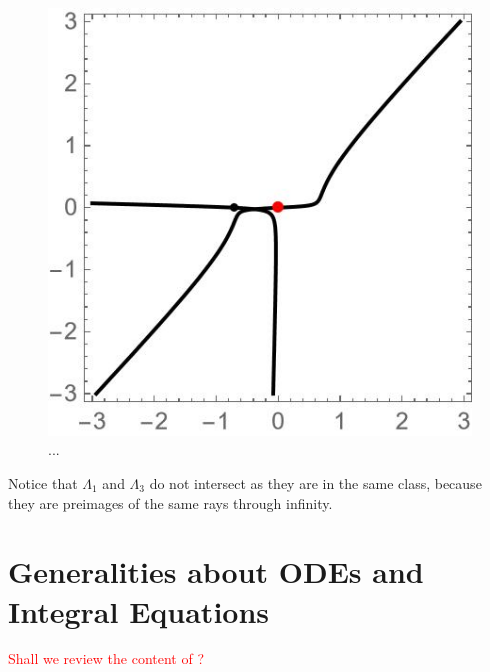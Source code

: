 \documentclass{article}
\theoremstyle{definition}
\begin{document}
\begin{figure}[ht]
     \includegraphics[scale=0.4]{figures/contour--AL4--12--inter.jpg}
    \caption{...}
    \label{fig:intersection_thimbles-AL4}
\end{figure}
Notice that $\Lambda_1$ and $\Lambda_3$ do not intersect as they are in the same class, because they are preimages of the same rays through infinity.    
\section{Generalities about ODEs and Integral Equations}
\textcolor{red}{Shall we review the content of \cite{reg-sing-volterra}?}
\end{document}
